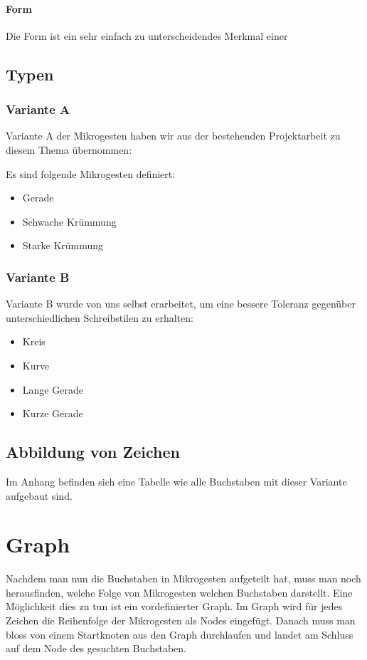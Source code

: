 \subsubsection{Form}
Die Form ist ein sehr einfach zu unterscheidendes Merkmal einer

\section{Typen}
\subsection{Variante A}
Variante A der Mikrogesten haben wir aus der bestehenden Projektarbeit \cite{zeichenerkennung_pa} zu diesem Thema übernommen: 

Es sind folgende Mikrogesten definiert:
\begin{itemize}
\item Gerade
\item Schwache Krümmung
\item Starke Krümmung
\end{itemize}

\subsection{Variante B}
Variante B wurde von uns selbst erarbeitet, um eine bessere Toleranz gegenüber unterschiedlichen Schreibstilen zu erhalten:\begin{itemize}
\item Kreis
\item Kurve
\item Lange Gerade
\item Kurze Gerade
\end{itemize}

\section{Abbildung von Zeichen}

Im Anhang befinden sich eine Tabelle wie alle Buchstaben mit dieser Variante aufgebaut sind.

\chapter{Graph}
Nachdem man nun die Buchstaben in Mikrogesten aufgeteilt hat, muss man noch herausfinden, welche Folge von Mikrogesten welchen Buchstaben darstellt. Eine Möglichkeit dies zu tun ist ein vordefinierter Graph. Im Graph wird für jedes Zeichen die Reihenfolge der Mikrogesten als Nodes eingefügt. Danach muss man bloss von einem Startknoten aus den Graph durchlaufen und landet am Schluss auf dem Node des gesuchten Buchstaben.

